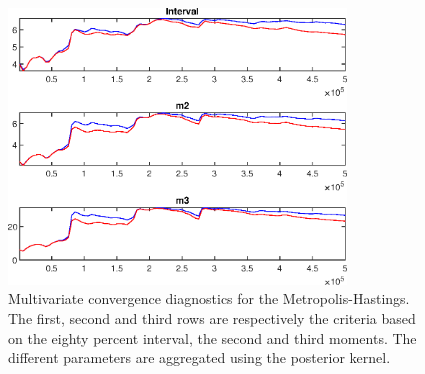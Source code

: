  
\begin{figure}[H]
\centering 
\includegraphics[width=0.8\textwidth]{BRS_growth_ext_fd/Output/BRS_growth_ext_fd_mdiag}
\caption{Multivariate convergence diagnostics for the Metropolis-Hastings.
The first, second and third rows are respectively the criteria based on
the eighty percent interval, the second and third moments. The different 
parameters are aggregated using the posterior kernel.}\label{Fig:MultivariateDiagnostics}
\end{figure}

